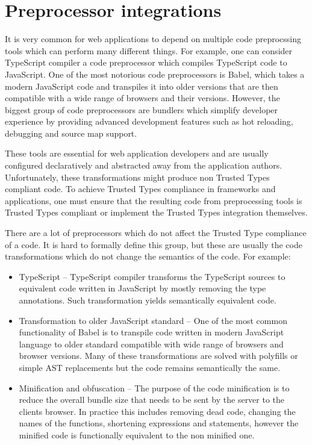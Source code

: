 \chapter{Preprocessor integrations}

It is very common for web applications to depend on multiple code preprocssing tools which can
perform many different things. For example, one can consider TypeScript compiler a code preprocessor
which compiles TypeScript code to JavaScript. One of the most notorious code preprocessors is Babel,
which takes a modern JavaScript code and transpiles it into older versions that are then compatible
with a wide range of browsers and their versions. However, the biggest group of code preprocessors
are bundlers which simplify developer experience by providing advanced development features such as
hot reloading, debugging and source map support.

These tools are essential for web application developers and are usually configured declaratively
and abstracted away from the application authors. Unfortunately, these transformations might produce
non Trusted Types compliant code. To achieve Trusted Types compliance in frameworks and
applications, one must ensure that the resulting code from preprocessing tools is Trusted Types
compliant or implement the Trusted Types integration themselves.

There are a lot of preprocessors which do not affect the Trusted Type compliance of a code. It is
hard to formally define this group, but these are usually the code transformations which do not
change the semantics of the code. For example:

\begin{itemize}
  \item TypeScript -- TypeScript compiler transforms the TypeScript sources to equivalent code
        written in JavaScript by mostly removing the type annotations. Such transformation yields
        semantically equivalent code.
  \item Transformation to older JavaScript standard -- One of the most common functionality of Babel
        is to transpile code written in modern JavaScript language to older standard compatible with
        wide range of browsers and browser versions. Many of these transformations are solved with
        polyfills or simple AST replacements but the code remains semantically the same.
  \item Minification and obfuscation -- The purpose of the code minification is to reduce the
        overall bundle size that needs to be sent by the server to the clients browser. In practice
        this includes removing dead code, changing the names of the functions, shortening
        expressions and statements, however the minified code is functionally equivalent to the non
        minified one.
\end{itemize}

